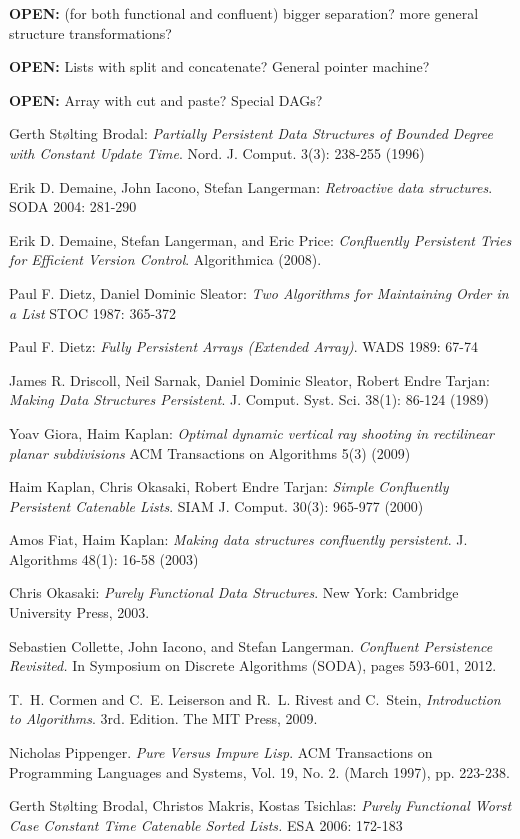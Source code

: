 \documentclass[11pt]{article}
\begin{document}
{\bf OPEN:} (for both functional and confluent) bigger separation? more general structure transformations? 

{\bf OPEN:} Lists with split and concatenate? General pointer machine? 

{\bf OPEN:} Array with cut and paste? Special DAGs?




\begin{thebibliography}{77}

Gerth Stølting Brodal: \emph{Partially Persistent Data Structures of Bounded Degree with Constant Update Time}. Nord. J. Comput. 3(3): 238-255 (1996)

Erik D. Demaine, John Iacono, Stefan Langerman: \emph{Retroactive data structures}. SODA 2004: 281-290

Erik D. Demaine, Stefan Langerman, and Eric Price: \emph{Confluently Persistent Tries for Efficient Version Control}. Algorithmica (2008).

Paul F. Dietz, Daniel Dominic Sleator: \emph{Two Algorithms for Maintaining Order in a List} STOC 1987: 365-372

Paul F. Dietz: \emph{Fully Persistent Arrays (Extended Array)}. WADS 1989: 67-74

James R. Driscoll, Neil Sarnak, Daniel Dominic Sleator, Robert Endre Tarjan: \emph{Making Data Structures Persistent}. J. Comput. Syst. Sci. 38(1): 86-124 (1989)

Yoav Giora, Haim Kaplan: \emph{Optimal dynamic vertical ray shooting in rectilinear planar subdivisions} ACM Transactions on Algorithms 5(3) (2009)

Haim Kaplan, Chris Okasaki, Robert Endre Tarjan: \emph{Simple Confluently Persistent Catenable Lists}. SIAM J. Comput. 30(3): 965-977 (2000)

Amos Fiat, Haim Kaplan: \emph{Making data structures confluently persistent}. J. Algorithms 48(1): 16-58 (2003)

Chris Okasaki: \emph{Purely Functional Data Structures}. New York: Cambridge University Press, 2003.

Sebastien Collette, John Iacono, and Stefan Langerman. \emph{Confluent Persistence Revisited.} In Symposium on Discrete Algorithms (SODA), pages 593-601, 2012.

T.~H. Cormen and C.~E. Leiserson and R.~L. Rivest and C.~Stein,   \emph{Introduction to Algorithms}. 3rd. Edition. The MIT Press, 2009.

Nicholas Pippenger. \emph{Pure Versus Impure Lisp}. ACM Transactions on Programming Languages and Systems, Vol. 19, No. 2. (March 1997), pp. 223-238.

Gerth Stølting Brodal, Christos Makris, Kostas Tsichlas: \emph{Purely Functional Worst Case Constant Time Catenable Sorted Lists.} ESA 2006: 172-183

\end{thebibliography}
\end{document}
